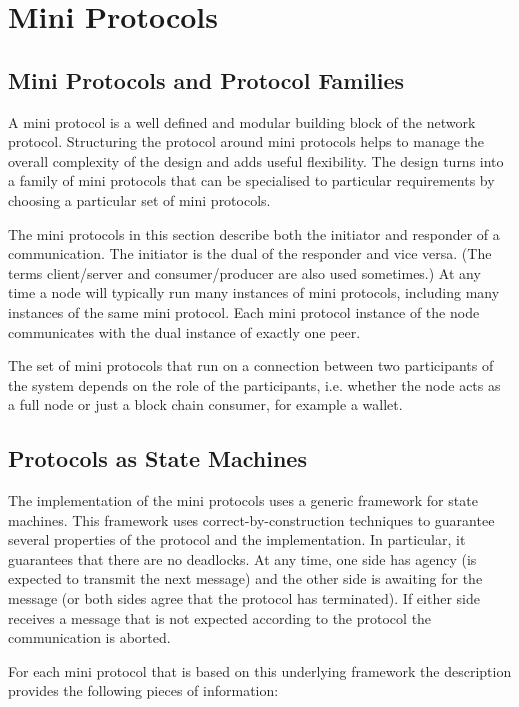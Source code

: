 \chapter{Mini Protocols}
\label{chapter:mini-protocols}

\section{Mini Protocols and Protocol Families}
A mini protocol is a well defined and modular building block of
the network protocol.
Structuring the protocol around mini protocols helps to manage the overall complexity of
the design and adds useful flexibility.
The design turns into a family of mini protocols that can be specialised to particular requirements
by choosing a particular set of mini protocols.

The mini protocols in this section describe both the initiator and responder of a communication.
The initiator is the dual of the responder and vice versa.
(The terms client/server and consumer/producer are also used sometimes.)
At any time a node will typically run many instances of mini protocols, including many instances of the
same mini protocol.
Each mini protocol instance of the node communicates with the dual instance of
exactly one peer.

The set of mini protocols that run on a connection between two participants of the system
depends on the role of the participants, i.e. whether the node acts as a full node or just
a block chain consumer, for example a wallet.

\section{Protocols as State Machines}
The implementation of the mini protocols uses a generic framework for state machines.
This framework uses correct-by-construction techniques to guarantee
several properties of the protocol and the implementation.
In particular, it guarantees that there are no deadlocks.
At any time, one side has agency
(is expected to transmit the next message) and the other side is awaiting for
the message (or both sides agree that the protocol has terminated).
If either side receives a message that is not expected according to the protocol
the communication is aborted.

For each mini protocol that is based on this underlying framework the description provides the
following pieces of information:

